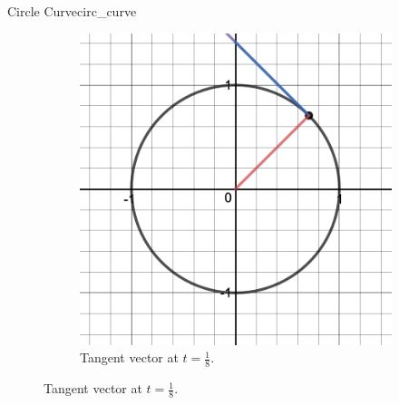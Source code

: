 \begin{ex}{Circle Curve}{circ_curve}
\begin{figure}[H]
\begin{subfigure}[h]{0.45\textwidth}
        \includegraphics[width=\textwidth]{Figures/circ_tang_2.png}
        \caption{Tangent vector at $t=\frac{1}{8}$.}
    \end{subfigure}
    

\end{figure}
\end{ex}
